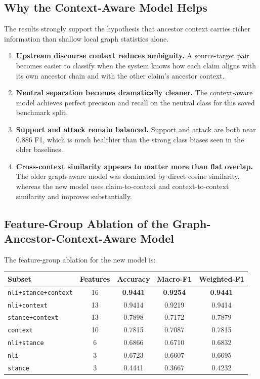 \documentclass[11pt,a4paper]{article}
\begin{document}
\subsection{Why the Context-Aware Model Helps}
The results strongly support the hypothesis that ancestor context carries richer information than shallow local graph statistics alone.
\begin{enumerate}[label=\arabic*.]
  \item \textbf{Upstream discourse context reduces ambiguity.} A source-target pair becomes easier to classify when the system knows how each claim aligns with its own ancestor chain and with the other claim's ancestor context.
  \item \textbf{Neutral separation becomes dramatically cleaner.} The context-aware model achieves perfect precision and recall on the neutral class for this saved benchmark split.
  \item \textbf{Support and attack remain balanced.} Support and attack are both near \(0.886\) F1, which is much healthier than the strong class biases seen in the older baselines.
  \item \textbf{Cross-context similarity appears to matter more than flat overlap.} The older graph-aware model was dominated by direct cosine similarity, whereas the new model uses claim-to-context and context-to-context similarity and improves substantially.
\end{enumerate}

\subsection{Feature-Group Ablation of the Graph-Ancestor-Context-Aware Model}
The feature-group ablation for the new model is:

\begin{center}
\begin{tabular}{lcccc}
\toprule
Subset & Features & Accuracy & Macro-F1 & Weighted-F1 \\
\midrule
\texttt{nli+stance+context} & 16 & \textbf{0.9441} & \textbf{0.9254} & \textbf{0.9441} \\
\texttt{nli+context} & 13 & 0.9414 & 0.9219 & 0.9414 \\
\texttt{stance+context} & 13 & 0.7898 & 0.7172 & 0.7879 \\
\texttt{context} & 10 & 0.7815 & 0.7087 & 0.7815 \\
\texttt{nli+stance} & 6 & 0.6866 & 0.6710 & 0.6832 \\
\texttt{nli} & 3 & 0.6723 & 0.6607 & 0.6695 \\
\texttt{stance} & 3 & 0.4441 & 0.3667 & 0.4232 \\
\bottomrule
\end{tabular}
\end{center}
\end{document}
